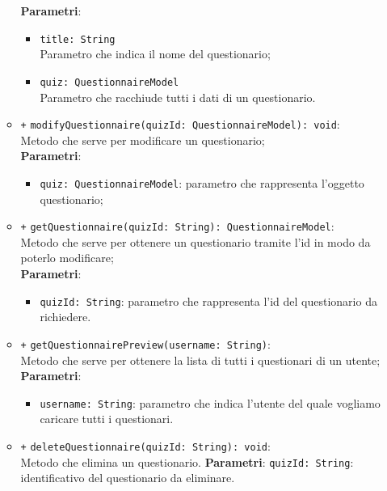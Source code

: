 \begin{itemize}
\begin{itemize}
			\textbf{Parametri}:
			\begin{itemize}
				\item \texttt{title: String} \\ Parametro che indica il nome del questionario;
				\item \texttt{quiz: QuestionnaireModel} \\ Parametro che racchiude tutti i dati di un questionario.
			\end{itemize}
			\item \texttt{+} \texttt{modifyQuestionnaire(quizId: QuestionnaireModel): void}: \\ Metodo che serve per modificare un questionario; \\
			\textbf{Parametri}:
			\begin{itemize}
				\item \texttt{quiz: QuestionnaireModel}: parametro che rappresenta l'oggetto questionario;
			\end{itemize}
			\item \texttt{+} \texttt{getQuestionnaire(quizId: String): QuestionnaireModel}: \\Metodo che serve per ottenere un questionario tramite l'id in modo da poterlo modificare; \\
			\textbf{Parametri}:
			\begin{itemize}
				\item \texttt{quizId: String}: parametro che rappresenta l'id del questionario da richiedere.
			\end{itemize}
			\item \texttt{+} \texttt{getQuestionnairePreview(username: String)}: \\ Metodo che serve per ottenere la lista di tutti i questionari di un utente; \\
			\textbf{Parametri}:
			\begin{itemize}
				\item \texttt{username: String}: parametro che indica l'utente del quale vogliamo caricare tutti i questionari.
			\end{itemize}
			\item \texttt{+} \texttt{deleteQuestionnaire(quizId: String): void}: \\Metodo che elimina un questionario.
			\textbf{Parametri}:
			\texttt{quizId: String}: identificativo del questionario da eliminare.
		\end{itemize}
	\end{itemize}
	
	